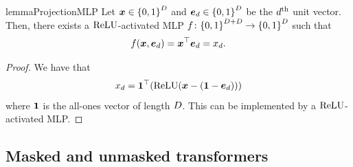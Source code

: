 \begin{restatable}{lemma}{ProjectionMLP} \label{lem:projection-mlp} 
   Let ${{{\bm{x}}}} \in {\left\{ 0, 1 \right\}}^{{D}}$ and ${{{\bm{e}}}}_{{d}} \in {\left\{ 0, 1 \right\}}^{{D}}$ be the ${{d}}\textsuperscript{th}$ unit vector.
   Then, there exists a ${{\mathrm{ReLU}}}$-activated MLP ${{{f}}}\colon {\left\{ 0, 1 \right\}}^{{{D}} + {{D}}} \to {\left\{ 0, 1 \right\}}^{{D}}$ such that
   \begin{equation}
      {{{f}}}({{{\bm{x}}}}, {{{\bm{e}}}}_{{d}}) = {{{{{\bm{x}}}}^\top {{{\bm{e}}}}_{{d}}}} = {{{x}}}_{{d}}.
   \end{equation}
\end{restatable}
\begin{proof}
   We have that 
   \begin{equation}
      \evx_\dimidx = \inner{\one}{\mleft(\ReLUFun{\vx - \mleft(\one - \ve_\dimidx\mright)}\mright)}
   \end{equation}
   where ${{\bm{1}}}$ is the all-ones vector of length ${{D}}$.
   This can be implemented by a ${{\mathrm{ReLU}}}$-activated MLP.
\end{proof}

\subsection{Masked and unmasked transformers} \label{app:masked-unmasked-transformers}

